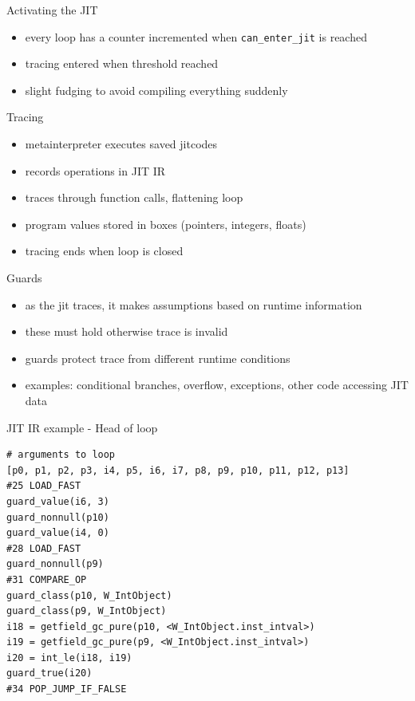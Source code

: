 \documentclass[14pt]{beamer}
\begin{document}
\begin{frame}[fragile]{Activating the JIT}
\begin{itemize}
\item every loop has a counter incremented when \verb+can_enter_jit+ is reached
\item tracing entered when threshold reached
\item slight fudging to avoid compiling everything suddenly
\end{itemize}
\end{frame}

\begin{frame}{Tracing}
\begin{itemize}
\item metainterpreter executes saved jitcodes
\item records operations in JIT IR
\item traces through function calls, flattening loop
\item program values stored in boxes (pointers, integers, floats)
\item tracing ends when loop is closed
\end{itemize}
\end{frame}

\begin{frame}{Guards}
\begin{itemize}
\item as the jit traces, it makes assumptions based on runtime information
\item these must hold otherwise trace is invalid
\item guards protect trace from different runtime conditions
\item examples: conditional branches, overflow, exceptions, other code accessing JIT data
\end{itemize}
\end{frame}

\begin{frame}[fragile]{JIT IR example - Head of loop}
\footnotesize{
\begin{verbatim}
# arguments to loop
[p0, p1, p2, p3, i4, p5, i6, i7, p8, p9, p10, p11, p12, p13]
#25 LOAD_FAST
guard_value(i6, 3)
guard_nonnull(p10)
guard_value(i4, 0)
#28 LOAD_FAST
guard_nonnull(p9)
#31 COMPARE_OP
guard_class(p10, W_IntObject)
guard_class(p9, W_IntObject)
i18 = getfield_gc_pure(p10, <W_IntObject.inst_intval>)
i19 = getfield_gc_pure(p9, <W_IntObject.inst_intval>)
i20 = int_le(i18, i19)
guard_true(i20)
#34 POP_JUMP_IF_FALSE
\end{verbatim}
}
\end{frame}
\end{document}
